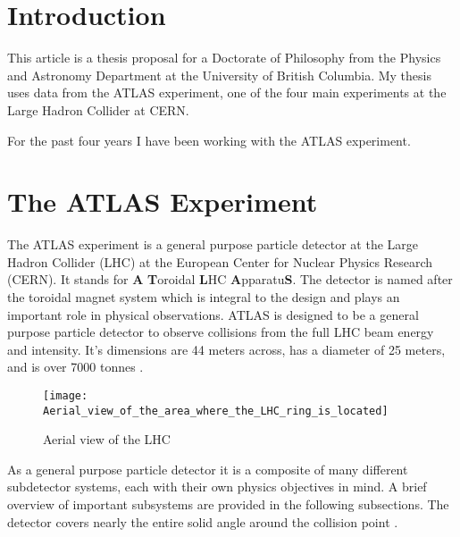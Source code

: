 \documentclass[12pt]{article}
\begin{document}

\newpage

\newpage
\section{Introduction}
This article is a thesis proposal for a Doctorate of Philosophy from the
Physics and Astronomy Department at the University of British Columbia. My
thesis uses data from the ATLAS experiment, one of the four main experiments at
the Large
Hadron Collider at CERN.

For the past four years I have been working with the ATLAS experiment.


\section{The ATLAS Experiment}
The ATLAS experiment is a general purpose particle detector at the Large Hadron
Collider (LHC) at the European Center for Nuclear Physics Research (CERN). It
stands for \textbf{A} \textbf{T}oroidal \textbf{L}HC \textbf{A}pparatu\textbf{S}.
The detector is named after the toroidal magnet system which is integral to the
design and plays an important role in physical observations. ATLAS is designed
to be a general purpose particle detector to observe collisions from the full
LHC beam energy and intensity. It's dimensions are 44 meters across, has a
diameter of 25 meters, and is over 7000 tonnes \cite{Aad_2024}. 
\begin{wrapfigure}{l}{0.42\textwidth}
    \centering
    \texttt{[image: Aerial\_view\_of\_the\_area\_where\_the\_LHC\_ring\_is\_located]}
    \caption{Aerial view of the LHC}
    \label{fig:aerial_view}
\end{wrapfigure}
As a general purpose particle detector it is a composite of many different
subdetector systems, each with their own physics objectives in mind. A brief
overview of important subsystems are provided in the following subsections. The
detector covers nearly the entire solid angle around the collision point
\cite{The_ATLAS_Collaboration_2008}. 
\end{document}
